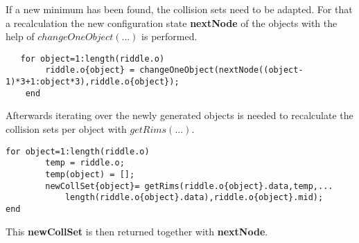 If a new minimum has been found, the collision sets need to be adapted. For that a recalculation the new configuration state \textbf{nextNode} of the objects with the help of $changeOneObject(...)$ is performed.
\begin{lstlisting}
   for object=1:length(riddle.o)
        riddle.o{object} = changeOneObject(nextNode((object-1)*3+1:object*3),riddle.o{object});    
    end
\end{lstlisting}
Afterwards iterating over the newly generated objects  is needed to recalculate the collision sets per object with $getRims(...)$.
\begin{lstlisting}
for object=1:length(riddle.o)
        temp = riddle.o;
        temp(object) = [];
        newCollSet{object}= getRims(riddle.o{object}.data,temp,...
            length(riddle.o{object}.data),riddle.o{object}.mid);
end
\end{lstlisting}
This \textbf{newCollSet} is then returned together with \textbf{nextNode}.


